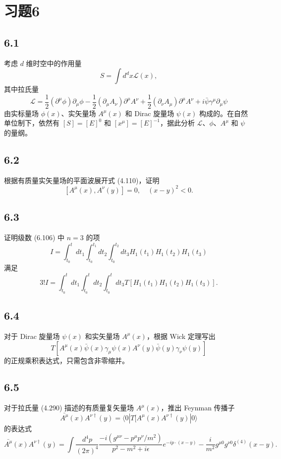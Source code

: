 \section{习题6}

\newpage
\subsection{6.1}
考虑 $d$ 维时空中的作用量
$$ S = \int d^d x  \mathcal{L}(x), \tag{6.412} $$
其中拉氏量
$$ \mathcal{L} = \frac{1}{2}(\partial^\mu \phi) \partial_\mu \phi - \frac{1}{2}(\partial_\mu A_\nu) \partial^\mu A^\nu + \frac{1}{2}(\partial_\nu A_\mu) \partial^\mu A^\nu + i \bar{\psi} \gamma^\mu \partial_\mu \psi \tag{6.413} $$
由实标量场 $\phi(x)$、实矢量场 $A^\mu(x)$ 和 Dirac 旋量场 $\psi(x)$ 构成的。在自然单位制下，依然有 $[S] = [E]^0$ 和 $[x^\mu] = [E]^{-1}$，据此分析 $\mathcal{L}$、$\phi$、$A^\mu$ 和 $\psi$ 的量纲。

\newpage
\subsection{6.2}
根据有质量实矢量场的平面波展开式 (4.110)，证明
$$ [A^\mu(x), A^\nu(y)] = 0, \quad (x - y)^2 < 0. \tag{6.414} $$

\newpage
\subsection{6.3}
证明级数 (6.106) 中 $n = 3$ 的项
$$ I = \int_{t_0}^t dt_1 \int_{t_0}^{t_1} dt_2 \int_{t_0}^{t_2} dt_3 H_1(t_1)H_1(t_2)H_1(t_3) \tag{6.415} $$
满足
$$ 3!I = \int_{t_0}^t dt_1 \int_{t_0}^t dt_2 \int_{t_0}^t dt_3 T[H_1(t_1)H_1(t_2)H_1(t_3)]. \tag{6.416} $$

\newpage
\subsection{6.4}
对于 Dirac 旋量场 $\psi(x)$ 和实矢量场 $A^\mu(x)$，根据 Wick 定理写出
$$ T[A^\mu(x)\bar{\psi}(x)\gamma_\mu \psi(x)A^\nu(y)\bar{\psi}(y)\gamma_\nu \psi(y)] \tag{6.417} $$
的正规乘积表达式，只需包含非零缩并。

\newpage
\subsection{6.5}
对于拉氏量 (4.290) 描述的有质量复矢量场 $A^\mu(x)$，推出 Feynman 传播子
$$ \bar{A^\mu}(x)A^{\nu\dagger}(y) = \langle 0|T[A^\mu(x)A^{\nu\dagger}(y)|0\rangle \tag{6.418} $$
的表达式
$$ \bar{A^\mu}(x)A^{\nu\dagger}(y) = \int \frac{d^4p}{(2\pi)^4} \frac{-i(g^{\mu\nu}-p^\mu p^\nu/m^2)}{p^2-m^2+i\epsilon} e^{-ip\cdot(x-y)} - \frac{i}{m^2} g^{\mu 0}g^{\nu 0}\delta^{(4)}(x-y). \tag{6.419} $$

